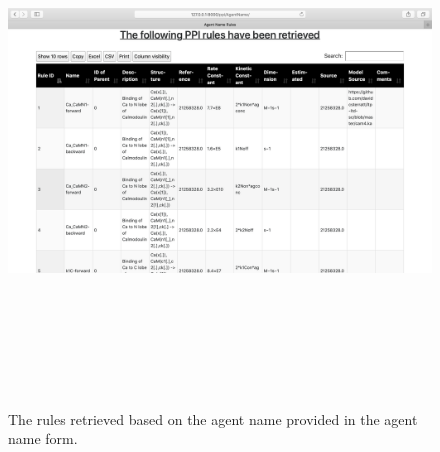 \documentclass[msc,deptreport,ai]{infthesis}      %
\begin{document}
  \begin{figure}[H]
	\centering
	\captionsetup{justification=centering}
	\includegraphics[width=\linewidth,height=14cm,keepaspectratio]{AgentNameRules.png}	
	\caption{The rules retrieved based on the agent name provided in the agent name form.}
	\label{fig:agentNameRules}		
\end{figure}
\end{document}
